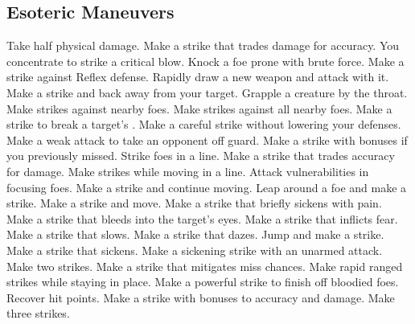 
\small
\subsection{Esoteric Maneuvers}\label{Esoteric Maneuvers}
\begin{spelllist}
 Take half physical damage.
 Make a strike that trades damage for accuracy.
 You concentrate to strike a critical blow.
 Knock a foe prone with brute force.
 Make a strike against Reflex defense.
 Rapidly draw a new weapon and attack with it.
 Make a strike and back away from your target.
 Grapple a creature by the throat.
 Make strikes against nearby foes.
 Make strikes against all nearby foes.
 Make a strike to break a target's .
 Make a careful strike without lowering your defenses.
 Make a weak attack to take an opponent off guard.
 Make a strike with bonuses if you previously missed.
 Strike foes in a line.
 Make a strike that trades accuracy for damage.
 Make strikes while moving in a line.
 Attack vulnerabilities in focusing foes.
 Make a strike and continue moving.
 Leap around a foe and make a strike.
 Make a strike and move.
 Make a strike that briefly sickens with pain.
 Make a strike that bleeds into the target's eyes.
 Make a strike that inflicts fear.
 Make a strike that slows.
 Make a strike that dazes.
 Jump and make a strike.
 Make a strike that sickens.
 Make a sickening strike with an unarmed attack.
 Make two strikes.
 Make a strike that mitigates miss chances.
 Make rapid ranged strikes while staying in place.
 Make a powerful strike to finish off bloodied foes.
 Recover hit points.
 Make a strike with bonuses to accuracy and damage.
 Make three strikes.
\end{spelllist}



